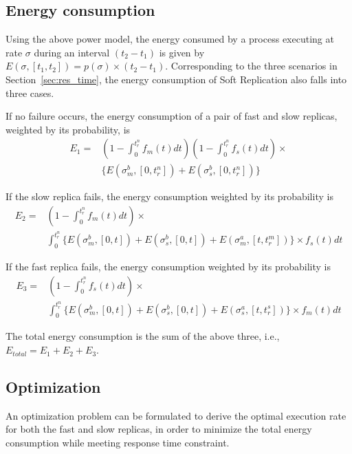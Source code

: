 \subsection{Energy consumption}
Using the above power model, the
energy consumed by a process executing at rate $\sigma$ during an
interval $(t_2-t_1)$ is given by 
$E(\sigma,[t_1, t_2]) = p(\sigma) \times (t_2-t_1)$. 
Corresponding to the three scenarios in Section~\ref{sec:res_time}, the energy consumption of Soft Replication also falls into three cases. 

If no failure occurs, the energy consumption of a pair of fast and slow replicas, weighted by its probability, is 
\begin{equation}
\begin{split}
E_1 = & (1-\int_{0}^{t_r^n} f_m(t)dt)(1-\int_{0}^{t_r^n} f_s(t)dt) \times \\
      & \{E(\sigma_m^b,[0,t_r^n])+E(\sigma_s^b,[0,t_r^n])\}
\label{eq:energy_no_failure}
\end{split}
\end{equation}

If the slow replica fails, the energy consumption weighted by its probability is 
\begin{equation}
\begin{split}
E_2 = & (1-\int_{0}^{t_r^n} f_m(t)dt) \times \\
      & \int_{0}^{t_r^n} \{E(\sigma_m^b, [0,t])+E(\sigma_s^b, [0,t])+E(\sigma_m^a, [t,t_r^m])\} \times f_s(t)dt
\end{split}
\end{equation}      

If the fast replica fails, the energy consumption weighted by its probability is 
\begin{equation}
\begin{split}
E_3 = & (1-\int_{0}^{t_r^n} f_s(t)dt) \times \\
      & \int_{0}^{t_r^n} \{E(\sigma_m^b, [0,t])+E(\sigma_s^b, [0,t])+E(\sigma_s^a, [t,t_r^s])\} \times f_m(t)dt
\end{split}
\end{equation}  

The total energy consumption is the sum of the above three, i.e., $E_{total}=E_1+E_2+E_3$.

 
\subsection{Optimization}
An optimization problem can be formulated to derive the optimal execution rate for both the fast and slow replicas, in order to minimize the total energy consumption while meeting response time constraint. 

